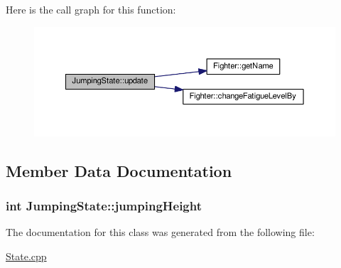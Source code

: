 Here is the call graph for this function\+:
\nopagebreak
\begin{figure}[H]
\begin{center}
\leavevmode
\includegraphics[width=350pt]{classJumpingState_aef36270d1d3aec51bdf4770e9ad571c8_cgraph}
\end{center}
\end{figure}




\subsection{Member Data Documentation}
\subsubsection[{\texorpdfstring{jumping\+Height}{jumpingHeight}}]{\setlength{\rightskip}{0pt plus 5cm}int Jumping\+State\+::jumping\+Height\hspace{0.3cm}{\ttfamily [private]}}\hypertarget{classJumpingState_a89897dfb7cc7758c21b256fc140adc5d}{}\label{classJumpingState_a89897dfb7cc7758c21b256fc140adc5d}


The documentation for this class was generated from the following file\+:\begin{DoxyCompactItemize}
\item 
\hyperlink{State_8cpp}{State.\+cpp}\end{DoxyCompactItemize}
